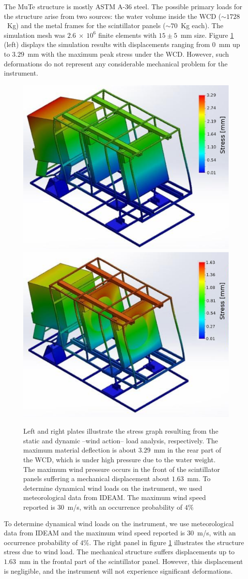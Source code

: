 \documentclass[letterpaper,11pt]{article}
\begin{document}
The MuTe structure is mostly ASTM A-36 steel. The possible primary loads for the structure arise from two sources: the water volume inside the WCD ($\sim 1728$~Kg) and the metal frames for the scintillator panels ($\sim 70$~Kg each). The simulation mesh was $2.6~\times~10^6$ finite elements with $15 \pm 5$~mm size. Figure \ref{fig:stress} (left) displays the simulation results with displacements ranging from  $0$~mm up to $3.29$~mm with the maximum peak stress under the WCD. However, such deformations do not represent any considerable mechanical problem for the instrument.
\begin{figure}[htb]
\centering
\includegraphics[width=0.48\columnwidth]{Figures/stress_graph.eps}
\includegraphics[width=0.48\columnwidth]{Figures/stress_graph_wind.eps}
\caption{Left and right plates illustrate the stress graph resulting from the static and dynamic --wind action-- load analysis, respectively. The maximum material deflection is about $3.29$~mm in the rear part of the WCD, which is under high pressure due to the water weight.  The maximum wind pressure occurs in the front of the scintillator panels suffering a mechanical displacement about $1.63$~mm. To determine dynamical wind loads on the instrument, we used meteorological data from IDEAM. The maximum wind speed reported is $30$~m/s, with an occurrence probability of $4\%$}
\label{fig:stress}
\end{figure}


To determine dynamical wind loads on the instrument, we use meteorological data from IDEAM and the maximum wind speed reported is $30$~m/s, with an occurrence probability of $4\%$. The right panel in figure \ref{fig:stress} illustrates the structure stress due to wind load. The mechanical structure suffers displacements up to $1.63$~mm in the frontal part of the scintillator panel. However, this displacement is negligible, and the instrument will not experience significant deformations.
\end{document}

